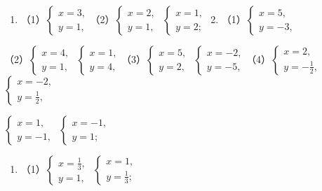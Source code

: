 \begin{enumerate}
\item
  （1）\(\left\{ \begin{array}{l} x = 3, \\ y = 1, \end{array} \right.\)（2）\(\left\{ \begin{array}{l} x = 2, \\ y = 1, \end{array} \right.\) \(\left\{ \begin{array}{l} x = 1, \\ y = 2; \end{array} \right.\)
  2.
  （1）\(\left\{ \begin{array}{l} x = 5, \\ y = -3, \end{array} \right.\)
\end{enumerate}

（2）\(\left\{ \begin{array}{l} x = 4, \\ y = 1, \end{array} \right.\) \(\left\{ \begin{array}{l} x = 1, \\ y = 4, \end{array} \right.\)（3）\(\left\{ \begin{array}{l} x = 5, \\ y = 2, \end{array} \right.\) \(\left\{ \begin{array}{l} x = -2, \\ y = -5, \end{array} \right.\)（4）\(\left\{ \begin{array}{l} x = 2, \\ y = -\frac{1}{2}, \end{array} \right.\) \(\left\{ \begin{array}{l} x = -2, \\ y = \frac{1}{2}, \end{array} \right.\)

\(\left\{ \begin{array}{l} x = 1, \\ y = -1, \end{array} \right.\) \(\left\{ \begin{array}{l} x = -1, \\ y = 1; \end{array} \right.\)

\begin{enumerate}[start=3]
\item
  （1）\(\left\{ \begin{array}{l} x = \frac{1}{3}, \\ y = 1, \end{array} \right.\) \(\left\{ \begin{array}{l} x = 1, \\ y = \frac{1}{3}; \end{array} \right.\)
\end{enumerate}

